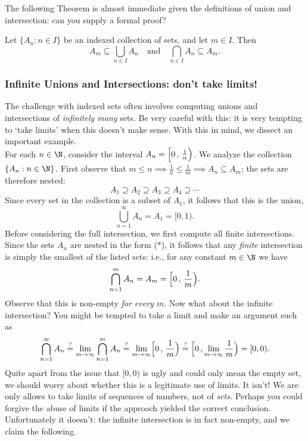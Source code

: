 \noindent The following Theorem is almost immediate given the definitions of union and intersection: can you supply a formal proof?

\begin{thm}
Let $\{A_n:n\in I\}$ be an indexed collection of sets, and let $m\in I$. Then
\[A_m\subseteq\bigcup_{n\in I}A_n\quad\text{and}\quad \bigcap_{n\in I}A_n\subseteq A_m.\]
\end{thm}





\subsubsection*{Infinite Unions and Intersections: don't take limits!}

The challenge with indexed sets often involves computing unions and intersections of \emph{infinitely many} sets. Be very careful with this: it is very tempting to `take limits' when this doesn't make sense. With this in mind, we dissect an important example.\\

\noindent For each $n\in\N$, consider the interval $A_n=\Bigl[0\,,\,\frac 1n\Bigr)$. We analyze the collection $\{A_n:n\in\N\}$. First observe that $m\le n\implies \frac 1n\le \frac 1m\implies A_n\subseteq A_m$; the sets are therefore nested:
\[A_1\supseteq A_2\supseteq A_3\supseteq A_4\supseteq\cdots\tag*{($\ast$)}\]
Since every set in the collection is a subset of $A_1$, it follows that this is the union,
\[\bigcup_{n=1}^\infty A_n=A_1=[0,1).\]
Before considering the full intersection, we first compute all finite intersections. Since the sets $A_n$ are nested in the form ($\ast$), it follows that any \emph{finite} intersection is simply the smallest of the listed sets: i.e., for any constant $m\in\N$ we have
\[\bigcap_{n=1}^mA_n=A_m=\Bigl[0\,,\,\frac 1m\Bigr).\]
Observe that this is non-empty \emph{for every $m$}. Now what about the infinite intersection? You might be tempted to take a limit and make an argument such as
\[\bigcap\limits_{n=1}^\infty A_n\overset{?}{=}\lim_{m\to\infty}\bigcap_{n=1}^mA_n\overset{?}{=}\lim_{m\to\infty}\Bigl[0\,,\,\frac 1m\Bigr)\overset{?}{=}\Bigl[0\,,\lim_{m\to\infty}\frac 1m\Bigr)=[0,0).\]
Quite apart from the issue that $[0,0)$ is ugly and could only mean the empty set, we should worry about whether this is a legitimate use of limits. It isn't! We are only allows to take limits of sequences of numbers, not of \emph{sets.} Perhaps you could forgive the abuse of limits if the approach yielded the correct conclusion. Unfortunately it doesn't: the infinite intersection is in fact non-empty, and we claim the following.


